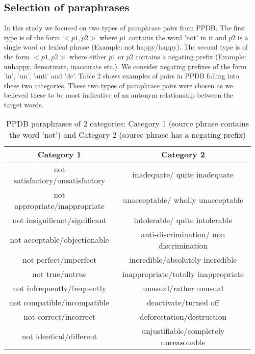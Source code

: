 \documentclass[11pt]{article}
\begin{document}
\subsection{Selection of paraphrases}
In this study we focused on two types of paraphrase pairs from PPDB. The first type is of the form $<p1, p2>$ where $p1$ contains the word 'not' in it and $p2$ is a single word or lexical phrase (Example: not happy/happy). The second type is of the form $<p1, p2>$ where either $p1$ or $p2$ contains a negating prefix (Example: unhappy, demotivate, inaccurate etc.). We consider negating prefixes of the form 'in', 'un', 'anti' and 'de'. Table 2 shows examples of pairs in PPDB falling into these two categories. These two types of paraphrase pairs were chosen as we believed these to be most indicative of an antonym relationship between the target words. 
\begin{table*}[h!]
\centering
 \begin{tabular}{|c | c|} 
 \hline
 Category 1 & Category 2 \\ [0.5ex] 
 \hline\hline
 not satisfactory/unsatisfactory & inadequate/ quite inadequate\\
 not appropriate/inappropriate & unacceptable/ wholly unacceptable\\
 not insignificant/significant & intolerable/ quite intolerable\\
 not acceptable/objectionable & anti-discrimination/ non discrimination\\
 not perfect/imperfect & incredible/absolutely incredible\\
 not true/untrue & inappropriate/totally inappropriate\\
 not infrequently/frequently & unusual/rather unusual\\
 not compatible/incompatible & deactivate/turned off\\
 not correct/incorrect & deforestation/destruction\\
 not identical/different & unjustifiable/completely unreasonable\\
 \hline
\end{tabular}
\caption{PPDB paraphrases of 2 categories: Category 1 (source phrase contains the word 'not') and Category 2 (source phrase has a negating prefix)}
\end{table*}
\end{document}
